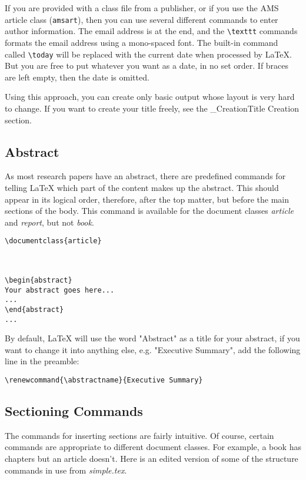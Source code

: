 If you are provided with a class file from a publisher, or if you use the AMS
article class (\texttt{amsart}), then you can use several different
commands to enter author information. The email address is at the end, and the
\verb|\texttt| commands formats the email address using a
mono-spaced font. The built-in command called \verb|\today| will
be replaced with the current date when processed by LaTeX. But you are free to
put whatever you want as a date, in no set order. If braces are left empty,
then the date is omitted. 

Using this approach, you can create only basic output whose layout is very hard
to change. If you want to create your title freely, see the \_CreationTitle
Creation section.

\subsection{ Abstract }
As most research papers have an abstract, there are predefined commands for
telling LaTeX which part of the content makes up the abstract. This should
appear in its logical order, therefore, after the top matter, but before the
main sections of the body. This command is available for the document classes
\textit{article} and \textit{report}, but not \textit{book}. 

\begin{lstlisting}
\documentclass{article}



\begin{abstract}
Your abstract goes here...
...
\end{abstract}
...

\end{lstlisting}

By default, LaTeX will use the word "Abstract" as a title for your abstract, if
you want to change it into anything else, e.g. "Executive Summary", add the
following line in the preamble:

\begin{lstlisting}
\renewcommand{\abstractname}{Executive Summary}
\end{lstlisting}


\subsection{ Sectioning Commands }
The commands for inserting sections are fairly intuitive. Of course, certain
commands are appropriate to different document classes. For example, a book has
chapters but an article doesn't. Here is an edited version of some of the
structure commands in use from \textit{simple.tex}.

